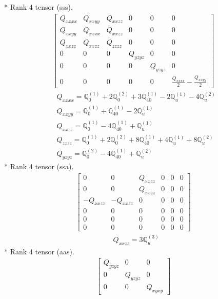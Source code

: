 \documentclass[fleqn,8pt,landscape]{jsarticle}
\begin{document}
* Rank 4 tensor (sss).
\begin{align*}
\begin{bmatrix} Q_{xxxx} & Q_{xxyy} & Q_{xxzz} & 0 & 0 & 0 \\ Q_{xxyy} & Q_{xxxx} & Q_{xxzz} & 0 & 0 & 0 \\ Q_{xxzz} & Q_{xxzz} & Q_{zzzz} & 0 & 0 & 0 \\ 0 & 0 & 0 & Q_{yzyz} & 0 & 0 \\ 0 & 0 & 0 & 0 & Q_{yzyz} & 0 \\ 0 & 0 & 0 & 0 & 0 & \frac{Q_{xxxx}}{2} - \frac{Q_{xxyy}}{2} \end{bmatrix}
\end{align*}
\begin{align*}
& Q_{xxxx} = \mathbb{Q}_{0}^{(1)} + 2 \mathbb{Q}_{0}^{(2)} + 3 \mathbb{Q}_{40}^{(1)} - 2 \mathbb{Q}_{u}^{(1)} - 4 \mathbb{Q}_{u}^{(2)} \\
& Q_{xxyy} = \mathbb{Q}_{0}^{(1)} + \mathbb{Q}_{40}^{(1)} - 2 \mathbb{Q}_{u}^{(1)} \\
& Q_{xxzz} = \mathbb{Q}_{0}^{(1)} - 4 \mathbb{Q}_{40}^{(1)} + \mathbb{Q}_{u}^{(1)} \\
& Q_{zzzz} = \mathbb{Q}_{0}^{(1)} + 2 \mathbb{Q}_{0}^{(2)} + 8 \mathbb{Q}_{40}^{(1)} + 4 \mathbb{Q}_{u}^{(1)} + 8 \mathbb{Q}_{u}^{(2)} \\
& Q_{yzyz} = \mathbb{Q}_{0}^{(2)} - 4 \mathbb{Q}_{40}^{(1)} + \mathbb{Q}_{u}^{(2)}
\end{align*}
* Rank 4 tensor (ssa).
\begin{align*}
\begin{bmatrix} 0 & 0 & Q_{xxzz} & 0 & 0 & 0 \\ 0 & 0 & Q_{xxzz} & 0 & 0 & 0 \\ - Q_{xxzz} & - Q_{xxzz} & 0 & 0 & 0 & 0 \\ 0 & 0 & 0 & 0 & 0 & 0 \\ 0 & 0 & 0 & 0 & 0 & 0 \\ 0 & 0 & 0 & 0 & 0 & 0 \end{bmatrix}
\end{align*}
\begin{align*}
& Q_{xxzz} = 3 \mathbb{Q}_{u}^{(3)}
\end{align*}
* Rank 4 tensor (aas).
\begin{align*}
\begin{bmatrix} Q_{yzyz} & 0 & 0 \\ 0 & Q_{yzyz} & 0 \\ 0 & 0 & Q_{xyxy} \end{bmatrix}
\end{align*}
\end{document}
